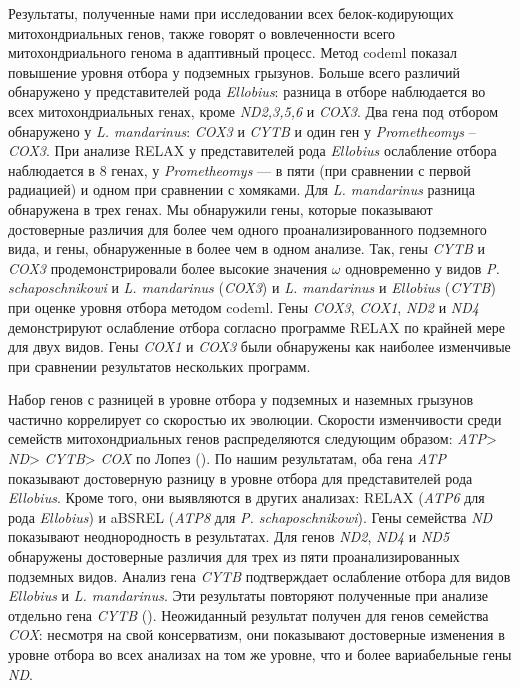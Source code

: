 Результаты, полученные нами при исследовании всех белок-кодирующих митохондриальных генов, также говорят о вовлеченности всего митохондриального генома в адаптивный процесс. Метод codeml показал повышение уровня отбора у подземных грызунов. Больше всего различий обнаружено у представителей рода \textit{Ellobius}: разница в отборе наблюдается во всех митохондриальных генах, кроме \textit{ND2,3,5,6} и \textit{COX3}. Два гена под отбором обнаружено у \textit{L. mandarinus}: \textit{COX3} и \textit{CYTB} и один ген у \textit{Prometheomys} -- \textit{COX3}. При анализе RELAX у представителей рода \textit{Ellobius} ослабление отбора наблюдается в 8 генах, у \textit{Prometheomys} --- в пяти (при сравнении с первой радиацией) и одном при сравнении с хомяками. Для \textit{L. mandarinus} разница обнаружена в трех генах. Мы обнаружили гены, которые показывают достоверные различия для более чем одного проанализированного подземного вида, и гены, обнаруженные в более чем в одном анализе.  Так, гены \textit{CYTB} и \textit{COX3} продемонстрировали более высокие значения $\omega$ одновременно у видов \textit{P. schaposchnikowi} и \textit{L. mandarinus} (\textit{COX3}) и \textit{L. mandarinus} и \textit{Ellobius} (\textit{CYTB}) при оценке уровня отбора методом codeml. Гены \textit{COX3}, \textit{COX1}, \textit{ND2} и \textit{ND4} демонстрируют ослабление отбора согласно программе RELAX по крайней мере для двух видов. Гены \textit{COX1} и \textit{COX3} были обнаружены как наиболее изменчивые при сравнении результатов нескольких программ. 

Набор генов с разницей в уровне отбора у подземных и наземных грызунов частично коррелирует со скоростью их эволюции. Скорости изменчивости среди семейств митохондриальных генов распределяются следующим образом: \textit{ATP}> \textit{ND}> \textit{CYTB}> \textit{COX} по Лопез (\cite{Lopez1997}). По нашим результатам, оба гена \textit{ATP} показывают достоверную разницу в уровне отбора для представителей рода \textit{Ellobius}. Кроме того, они выявляются в других анализах: RELAX (\textit{ATP6} для рода \textit{Ellobius}) и aBSREL (\textit{ATP8} для \textit{P. schaposchnikowi}). Гены семейства \textit{ND} показывают неоднородность в результатах. Для генов \textit{ND2}, \textit{ND4} и \textit{ND5} обнаружены достоверные различия для трех из пяти проанализированных подземных видов. Анализ гена \textit{CYTB} подтверждает ослабление отбора для видов \textit{Ellobius} и \textit{L. mandarinus}. Эти результаты повторяют полученные при анализе отдельно гена \textit{CYTB} (\cite{Bondareva2021}). Неожиданный результат получен для генов семейства \textit{COX}: несмотря на свой консерватизм, они показывают достоверные изменения в уровне отбора во всех анализах на том же уровне, что и более вариабельные гены \textit{ND}.

